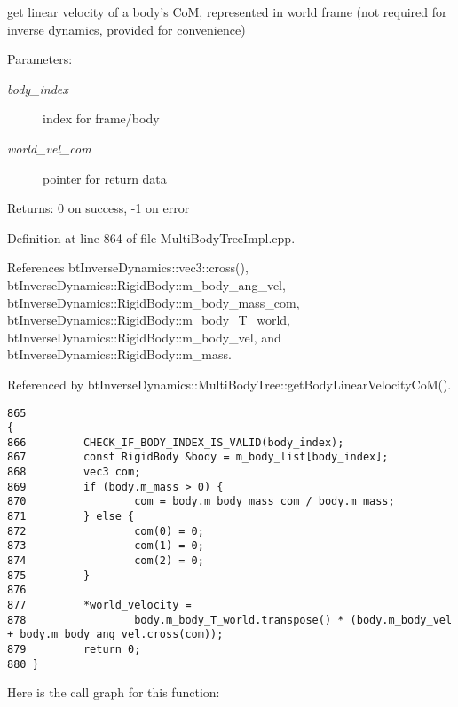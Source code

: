 get linear velocity of a body's CoM, represented in world frame (not required for inverse dynamics, provided for convenience) \begin{Desc}
\item[Parameters:]
\begin{description}
\item[{\em body\_\-index}]index for frame/body \item[{\em world\_\-vel\_\-com}]pointer for return data \end{description}
\end{Desc}
\begin{Desc}
\item[Returns:]0 on success, -1 on error \end{Desc}
 

Definition at line 864 of file MultiBodyTreeImpl.cpp.

References btInverseDynamics::vec3::cross(), btInverseDynamics::RigidBody::m\_\-body\_\-ang\_\-vel, btInverseDynamics::RigidBody::m\_\-body\_\-mass\_\-com, btInverseDynamics::RigidBody::m\_\-body\_\-T\_\-world, btInverseDynamics::RigidBody::m\_\-body\_\-vel, and btInverseDynamics::RigidBody::m\_\-mass.

Referenced by btInverseDynamics::MultiBodyTree::getBodyLinearVelocityCoM().

\begin{Code}\begin{verbatim}865                                                                                                                                                {
866         CHECK_IF_BODY_INDEX_IS_VALID(body_index);
867         const RigidBody &body = m_body_list[body_index];
868         vec3 com;
869         if (body.m_mass > 0) {
870                 com = body.m_body_mass_com / body.m_mass;
871         } else {
872                 com(0) = 0;
873                 com(1) = 0;
874                 com(2) = 0;
875         }
876 
877         *world_velocity =
878                 body.m_body_T_world.transpose() * (body.m_body_vel + body.m_body_ang_vel.cross(com));
879         return 0;
880 }
\end{verbatim}
\end{Code}




Here is the call graph for this function:

